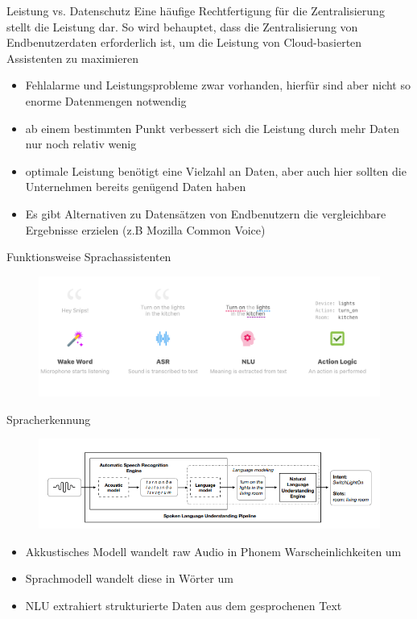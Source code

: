 \documentclass[aspectratio=169]{beamer}
\begin{document}
\begin{frame}{Leistung vs. Datenschutz}
	Eine häufige Rechtfertigung für die Zentralisierung stellt die Leistung dar. So wird behauptet, dass die Zentralisierung von Endbenutzerdaten erforderlich ist, um die Leistung von Cloud-basierten Assistenten zu maximieren
	\begin{itemize} 
		\item Fehlalarme und Leistungsprobleme zwar vorhanden, hierfür sind aber nicht so enorme Datenmengen notwendig
		\item ab einem bestimmten Punkt verbessert sich die Leistung durch mehr Daten nur noch relativ wenig
		\item optimale Leistung benötigt eine Vielzahl an Daten, aber auch hier sollten die Unternehmen bereits genügend Daten haben
		\item Es gibt Alternativen zu Datensätzen von Endbenutzern die vergleichbare Ergebnisse erzielen (z.B Mozilla Common Voice)
	\end{itemize}
\end{frame}

\begin{frame}{Funktionsweise Sprachassistenten}
	\begin{figure}
		\includegraphics[scale=0.22]{images/spoken-language-understanding2}
	\end{figure}
\end{frame}

\begin{frame}{Spracherkennung}
	\begin{figure}
		\includegraphics[scale=0.45]{images/spoken-language-understanding}
	\end{figure}
	\begin{itemize}
		\item Akkustisches Modell wandelt raw Audio in Phonem Warscheinlichkeiten um
		\item Sprachmodell wandelt diese in Wörter um
		\item NLU extrahiert strukturierte Daten aus dem gesprochenen Text
	\end{itemize}
\end{frame}
\end{document}
